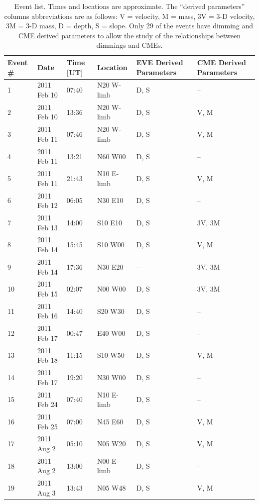 \begin{table}[!h]
    \caption[Semi-statistical study event list]{
        Event list. Times and locations are approximate. The “derived parameters” columns abbreviations are as follows: V = 
        velocity, M = mass, 3V = 3-D velocity, 3M = 3-D mass, D = depth, S = slope. Only 29 of the events have dimming and 
        CME derived parameters to allow the study of the relationships between dimmings and CMEs.
    }
    \begin{center}
    \begin{tabular}{|l|l|l|l|l|l|} \hline
	Event \# & Date & Time [UT] & Location & EVE Derived Parameters & CME Derived Parameters \\ \hline \hline
	1 & 2011 Feb 10 & 07:40 & N20 W-limb & D, S & -- \\ \hline
	2 & 2011 Feb 10 & 13:36 & N20 W-limb & D, S & V, M  \\ \hline
	3 & 2011 Feb 11 & 07:46 & N20 W-limb & D, S & V, M \\ \hline
	4 & 2011 Feb 11 & 13:21 & N60 W00 & D, S & -- \\ \hline
	5 & 2011 Feb 11 & 21:43 & N10 E-limb & D, S & V, M \\ \hline
	6 & 2011 Feb 12 & 06:05 & N30 E10 & D, S & -- \\ \hline
	7 & 2011 Feb 13 & 14:00 & S10 E10 & D, S & 3V, 3M \\ \hline
	8 & 2011 Feb 14 & 15:45 & S10 W00 & D, S & V, M \\ \hline
	9 & 2011 Feb 14 & 17:36 & N30 E20 & -- & 3V, 3M \\ \hline
	10 & 2011 Feb 15 & 02:07 & N00 W00 & D, S & 3V, 3M \\ \hline
	11 & 2011 Feb 16 & 14:40 & S20 W30 & D, S & -- \\ \hline
	12 & 2011 Feb 17 & 00:47 & E40 W00 & D, S & -- \\ \hline
	13 & 2011 Feb 18 & 11:15 & S10 W50 & D, S & V, M \\ \hline
	14 & 2011 Feb 17 & 19:20 & N30 W00 & D, S & -- \\ \hline
	15 & 2011 Feb 24 & 07:40 & N10 E-limb & D, S & -- \\ \hline
	16 & 2011 Feb 25 & 07:00 & N45 E60 & D, S & V, M \\ \hline
	17 & 2011 Aug 2 & 05:10 & N05 W20 & D, S & V, M \\ \hline
	18 & 2011 Aug 2 & 13:00 & N00 E-limb & D, S & -- \\ \hline
	19 & 2011 Aug 3 & 13:43 & N05 W48 & D, S & V, M \\ \hline

\end{tabular}
\end{center}
\end{table}
